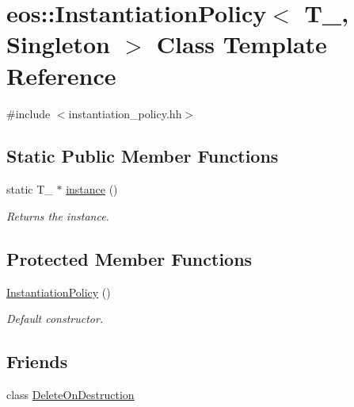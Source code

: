 \hypertarget{classeos_1_1InstantiationPolicy_3_01T___00_01Singleton_01_4}{
\section{eos::InstantiationPolicy$<$ T\_\-, Singleton $>$ Class Template Reference}
\label{classeos_1_1InstantiationPolicy_3_01T___00_01Singleton_01_4}
}


{\ttfamily \#include $<$instantiation\_\-policy.hh$>$}\subsection*{Static Public Member Functions}
\begin{DoxyCompactItemize}
\item 
static T\_\- $\ast$ \hyperlink{classeos_1_1InstantiationPolicy_3_01T___00_01Singleton_01_4_ab911bf9d8849e3af50a8fa886d0d5b70}{instance} ()
\begin{DoxyCompactList}\small\item\em Returns the instance. \item\end{DoxyCompactList}\end{DoxyCompactItemize}
\subsection*{Protected Member Functions}
\begin{DoxyCompactItemize}
\item 
\hyperlink{classeos_1_1InstantiationPolicy_3_01T___00_01Singleton_01_4_a18668ba37f53fb8e90de2ad25a8f9873}{InstantiationPolicy} ()
\begin{DoxyCompactList}\small\item\em Default constructor. \item\end{DoxyCompactList}\end{DoxyCompactItemize}
\subsection*{Friends}
\begin{DoxyCompactItemize}
\item 
class \hyperlink{classeos_1_1InstantiationPolicy_3_01T___00_01Singleton_01_4_a015c2abc647885b46b47d0ba104140b1}{DeleteOnDestruction}
\end{DoxyCompactItemize}
